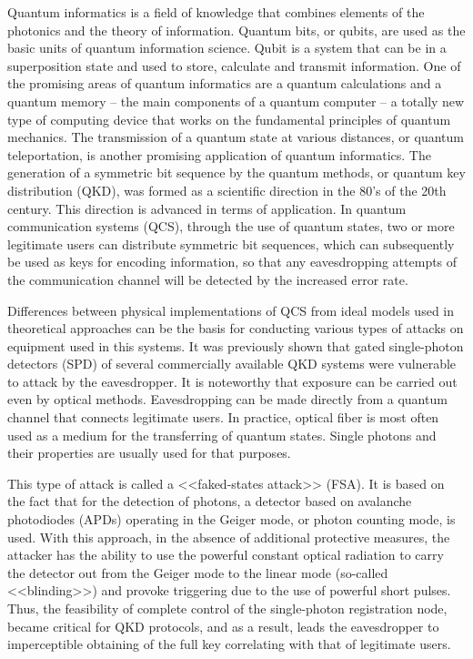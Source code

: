 
  {\relevance} 
  Quantum informatics is a field of knowledge that combines elements of the photonics and the theory of information. Quantum bits, or qubits, are used as the basic units of quantum information science. Qubit is a system that can be in a superposition state and used to store, calculate and transmit information. One of the promising areas of quantum informatics are a quantum calculations and a quantum memory -- the main components of a quantum computer -- a totally new type of computing device that works on the fundamental principles of quantum mechanics. The transmission of a quantum state at various distances, or quantum teleportation, is another promising application of quantum informatics. The generation of a symmetric bit sequence by the quantum methods, or quantum key distribution (QKD), was formed as a scientific direction in the 80's of the 20th century. This direction is advanced in terms of application. In quantum communication systems (QCS), through the use of quantum states, two or more legitimate users can distribute symmetric bit sequences, which can subsequently be used as keys for encoding information, so that any eavesdropping attempts of the communication channel will be detected by the increased error rate.
  
Differences between physical implementations of QCS from ideal models used in theoretical approaches can be the basis for conducting various types of attacks on equipment used in this systems. It was previously shown that gated single-photon detectors (SPD) of several commercially available QKD systems were vulnerable to attack by the eavesdropper. It is noteworthy that exposure can be carried out even by optical methods. Eavesdropping can be made directly from a quantum channel that connects legitimate users. In practice, optical fiber is most often used as a medium for the transferring of quantum states. Single photons and their properties are usually used for that purposes.
	
This type of attack is called a <<faked-states attack>> (FSA). It is based on the fact that for the detection of photons, a detector based on avalanche photodiodes (APDs) operating in the Geiger mode, or photon counting mode, is used. With this approach, in the absence of additional protective measures, the attacker has the ability to use the powerful constant optical radiation to carry the detector out from the Geiger mode to the linear mode (so-called <<blinding>>) and provoke triggering due to the use of powerful short pulses. Thus, the feasibility of complete control of the single-photon registration node, became critical for QKD protocols, and as a result, leads the eavesdropper to imperceptible obtaining of the full key correlating with that of legitimate users.
	


